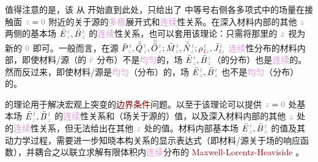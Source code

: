 值得注意的是，该  从  开始直到此处，只给出了  中等号右侧各多项式中的场量在接触面 $\mathcolor{gray}{z \mathcolor{black}{=} 0}$ 附近的关于源的\textcolor{Plum}{多极}展开式和\textcolor{Plum}{连续}性关系。在深入材料内部的其他 $\mathcolor{gray}{z}$ 两侧的\textcolor{NavyBlue}{基本场} $\bar{E}^{\;\!\mathcolor{gray}{t}}_{\;\!\mathcolor{gray}{z}}, \bar{B}^{\;\!\mathcolor{gray}{t}}_{\;\!\mathcolor{gray}{z}}$ 的\textcolor{Plum}{连续}性关系，也可以套用该理论：只需将那里的 $\mathcolor{gray}{z}$ 视为新的 $\mathcolor{gray}{0}$ 即可。一般而言，在源 $\bar{P}^{\;\!\mathcolor{gray}{t}}_{\;\!\mathcolor{gray}{z}},\bar{\bar{Q}}^{\;\!\mathcolor{gray}{t}}_{\;\!\mathcolor{gray}{z}},\bar{\bar{\bar{O}}}^{\;\!\mathcolor{gray}{t}}_{\;\!\mathcolor{gray}{z}} ; \bar{M}^{\;\!\mathcolor{gray}{t}}_{\;\!\mathcolor{gray}{z}}, \bar{\bar{N}}^{\;\!\mathcolor{gray}{t}}_{\;\!\mathcolor{gray}{z}};{\rho}^{\;\!\mathcolor{gray}{t}}_{\;\!\textcolor{Maroon}{\text{f}}\mathcolor{gray}{z}}, \bar{J}^{\;\!\mathcolor{gray}{t}}_{\;\!\textcolor{Maroon}{\text{f}}\mathcolor{gray}{z}}$ \textcolor{Plum}{连续}性分布的材料内部，即使材料/源（的 $\mathcolor{gray}{\bar{r}}$ 分布）不是\textcolor{Plum}{均匀}的，场 $\bar{E}^{\;\!\mathcolor{gray}{t}}_{\;\!\mathcolor{gray}{z}}, \bar{B}^{\;\!\mathcolor{gray}{t}}_{\;\!\mathcolor{gray}{z}}$（的分布）也是\textcolor{Plum}{连续}的。然而反过来，即使材料/源是\textcolor{Plum}{均匀}（分布）的，场 $\bar{E}^{\;\!\mathcolor{gray}{t}}_{\;\!\mathcolor{gray}{z}}, \bar{B}^{\;\!\mathcolor{gray}{t}}_{\;\!\mathcolor{gray}{z}}$ 也不是\textcolor{Plum}{均匀}（分布）的。

 的理论用于解决宏观上突变的\textcolor{Maroon}{边界条件}问题。以至于该理论可以提供 $\mathcolor{gray}{z \mathcolor{black}{=} 0}$ 处\textcolor{NavyBlue}{基本场} $\bar{E}^{\;\!\mathcolor{gray}{t}}_{\;\!\mathcolor{gray}{z}}, \bar{B}^{\;\!\mathcolor{gray}{t}}_{\;\!\mathcolor{gray}{z}}$ 的\textcolor{Plum}{连续}性关系和（场关于源的）值，以及深入材料内部的其他 $\mathcolor{gray}{z}$ 处的\textcolor{Plum}{连续}性关系，但无法给出在其他 $\mathcolor{gray}{z}$ 处的值。材料内部\textcolor{NavyBlue}{基本场} $\bar{E}^{\;\!\mathcolor{gray}{t}}_{\;\!\mathcolor{gray}{z}}, \bar{B}^{\;\!\mathcolor{gray}{t}}_{\;\!\mathcolor{gray}{z}}$ 的值及其动力学过程，需要进一步知晓本构关系的显示表达式（即材料/源关于场的响应函数）\cite{raabMultipoleTheoryElectromagnetism2004}，并耦合之以联立求解有限体积内\textcolor{Plum}{连续}分布\cite{landauCHAPTERXIELECTROMAGNETIC1984}的 \textcolor{Maroon}{Maxwell-Lorentz-Heaviside} 。

